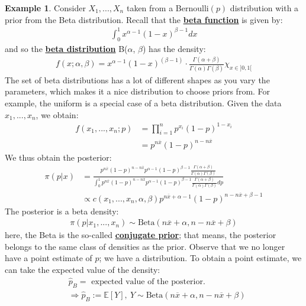 \documentclass[11pt]{scrartcl}
\theoremstyle{definition}
\newtheorem{ex}{Example}
\theoremstyle{remark}
\newcommand{\dfn}[1]{\textbf{\underline{#1}}}
\newcommand{\EX}[1]{\mathbb{E}\left[#1 \right]}
\newcommand{\idx}[2]{\int_{#1}^{#2}}
\begin{document}
{\begin{ex}
	Consider $X_1, ..., X_n$ taken from a Bernoulli$(p)$ distribution with a prior from the Beta distribution. Recall that the \dfn{beta function} is given by: 
	\begin{align*}
		\idx{0}{1} x^{\alpha -1} (1-x)^{\beta -1} dx 	
	\end{align*}
	and so the \dfn{beta distribution} B($\alpha$, $\beta$) has the density: 
	\begin{align}
		f(x; \alpha, \beta) = x^{\alpha - 1} (1-x)^{(\beta -1)} \cdot \frac{\Gamma (\alpha + \beta)}{\Gamma (\alpha) \Gamma (\beta)} \chi_{x \in ]0,1[}
	\end{align}
	The set of beta distributions has a lot of different shapes as you vary the parameters, which makes it a nice distribution to choose priors from. For example, the uniform is a special case of a beta distribution. Given the data $x_1, ..., x_n$, we obtain: 
	\begin{align*}
		f(x_1, ..., x_n; p) & = \prod_{i=1}^n p^{x_i}(1-p)^{1-x_i} 	\\
						    & = p^{n \overline{x}} (1-p)^{n - n \overline{x}} 
	\end{align*}
	We thus obtain the posterior: 
	\begin{align*}
		\pi (p | x ) & = \frac{p^{n \overline{x}} (1-p)^{n - n \overline{x}}  p^{\alpha -1} (1-p)^{\beta -1 } \frac{\Gamma (\alpha + \beta)}{\Gamma(\alpha) \Gamma(\beta)}}{\idx{0}{1}p^{n \overline{x}} (1-p)^{n - n \overline{x}}  p^{\alpha -1} (1-p)^{\beta -1 }  \frac{\Gamma (\alpha + \beta)}{\Gamma(\alpha) \Gamma(\beta)} dp }	\\
			& \propto c (x_1, ..., x_n, \alpha, \beta) p^{n \overline{x} + \alpha - 1} (1-p)^{n - n \overline{x} + \beta -1 } 
	\end{align*}
	The posterior is a beta density: 
	\begin{align*}
		\pi (p | x_1, ..., x_n) \sim \text{Beta}(n \overline{x} + \alpha, n - n \overline{x} + \beta) 	
	\end{align*}
	here, the Beta is the so-called \dfn{conjugate prior}; that means, the posterior belongs to the same class of densities as the prior. Observe that we no longer have a point estimate of $p$; we have a distribution. To obtain a point estimate, we can take the expected value of the density: 
	\begin{align*}
		& \hat{p}_B = \text{ expected value of the posterior. } 	\\
		& \Rightarrow \hat{p}_B := \EX{Y},\ Y \sim \text{Beta}(n \overline{x} + \alpha, n - n \overline{x} + \beta)

\end{align*}
\end{ex}}
\end{document}

